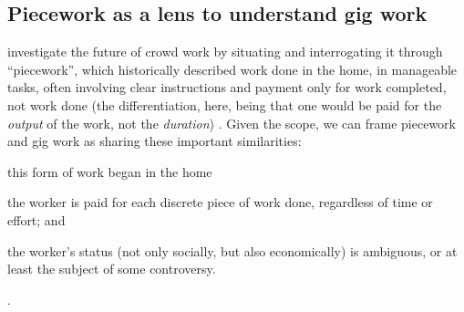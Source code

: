 \documentclass{sigchi}
\newcommand{\msb}[1]{{\color{PineGreen}[MSB: #1]}}
\newcommand{\ali}[1]{{\color{BrickRed}[\textit{al2: #1}]}}
\begin{document}
\subsection{Piecework as a lens to understand gig work}
\citeauthor{crowdworkFuture}
investigate the future of crowd work by
situating and interrogating it through ``piecework'',
which historically described work done in the home,
in manageable tasks,
often involving clear instructions
and payment only for work completed, not work done
(the differentiation, here, being that
one would be paid for the \textit{output} of the work,
not the \textit{duration})
\cite{crowdworkFuture}.
Given the scope,
we can frame piecework and gig work as sharing these important similarities:
\begin{inlinelist}
\item this form of work began in the home
\item the worker is paid for each discrete piece of work done, regardless of time or effort; and
\item the worker's status
(not only socially, but also economically)
is ambiguous, or at least the subject of some controversy.
\end{inlinelist}. 
\end{document}
